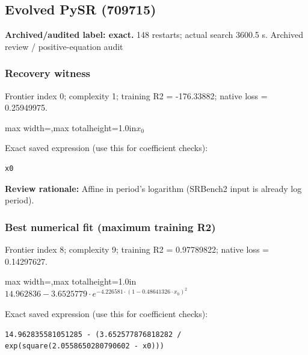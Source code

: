 \documentclass[10pt,letterpaper,landscape]{article}
\begin{document}
\begin{minipage}[t]{0.485\textwidth}
\subsection*{Evolved PySR (709715)}
\textbf{Archived/audited label: exact.} 148 restarts; actual search 3600.5 s.
{\small Archived review / positive-equation audit}
\subsubsection*{Recovery witness}
Frontier index 0; complexity 1; training R2 = -176.33882; native loss = 0.25949975.
\begin{center}\begin{adjustbox}{max width=\linewidth,max totalheight=1.0in}$\displaystyle x_{0}$\end{adjustbox}\end{center}
{\scriptsize Exact saved expression (use this for coefficient checks):}
\begin{lstlisting}
x0
\end{lstlisting}
{\small\textbf{Review rationale:} Affine in period's logarithm (SRBench2 input is already log period).}
\subsubsection*{Best numerical fit (maximum training R2)}
Frontier index 8; complexity 9; training R2 = 0.97789822; native loss = 0.14297627.
\begin{center}\begin{adjustbox}{max width=\linewidth,max totalheight=1.0in}$\displaystyle 14.962836 - 3.6525779 \cdot e^{- 4.226581 \cdot \left(1 - 0.48641326 \cdot x_{0}\right)^{2}}$\end{adjustbox}\end{center}
{\scriptsize Exact saved expression (use this for coefficient checks):}
\begin{lstlisting}
14.962835581051285 - (3.652577876818282 / exp(square(2.0558650280790602 - x0)))
\end{lstlisting}
\end{minipage}
\clearpage{}\label{leavitt-10001}
\end{document}
